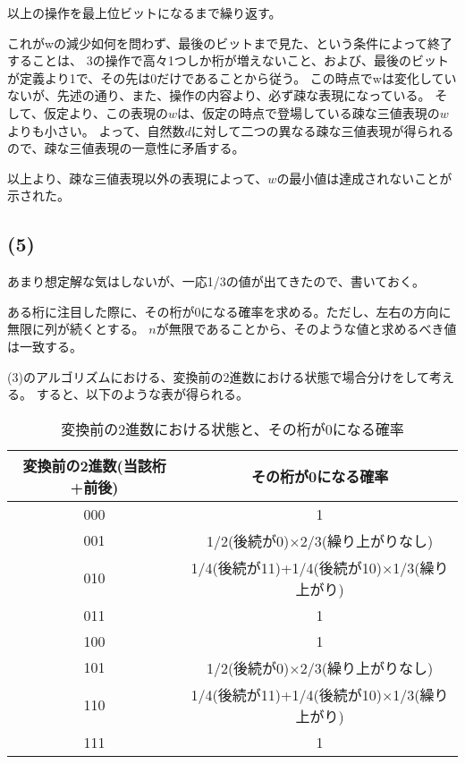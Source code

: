\documentclass[a4paper, 10pt, dvipdfmx]{jlreq}
\begin{document}
以上の操作を最上位ビットになるまで繰り返す。

これがwの減少如何を問わず、最後のビットまで見た、という条件によって終了することは、
3の操作で高々1つしか桁が増えないこと、および、最後のビットが定義より1で、その先は0だけであることから従う。
この時点でwは変化していないが、先述の通り、また、操作の内容より、必ず疎な表現になっている。
そして、仮定より、この表現の$w$は、仮定の時点で登場している疎な三値表現の$w$よりも小さい。
よって、自然数$d$に対して二つの異なる疎な三値表現が得られるので、疎な三値表現の一意性に矛盾する。

以上より、疎な三値表現以外の表現によって、$w$の最小値は達成されないことが示された。

\subsection*{(5)}

あまり想定解な気はしないが、一応1/3の値が出てきたので、書いておく。

ある桁に注目した際に、その桁が0になる確率を求める。ただし、左右の方向に無限に列が続くとする。
$n$が無限であることから、そのような値と求めるべき値は一致する。

(3)のアルゴリズムにおける、変換前の2進数における状態で場合分けをして考える。
すると、以下のような表が得られる。

\begin{table}[hbtp]
  \caption{変換前の2進数における状態と、その桁が0になる確率}
  \centering
  \begin{tabular}{cc}
    \toprule
    変換前の2進数(当該桁+前後) & その桁が0になる確率                              \\
    \midrule
    000             & 1                                       \\
    001             & 1/2(後続が0)$\times$2/3(繰り上がりなし)           \\
    010             & 1/4(後続が11)+1/4(後続が10)$\times$1/3(繰り上がり) \\
    011             & 1                                       \\
    100             & 1                                       \\
    101             & 1/2(後続が0)$\times$2/3(繰り上がりなし)           \\
    110             & 1/4(後続が11)+1/4(後続が10)$\times$1/3(繰り上がり) \\
    111             & 1                                       \\
    \bottomrule
  \end{tabular}
\end{table}
\end{document}

